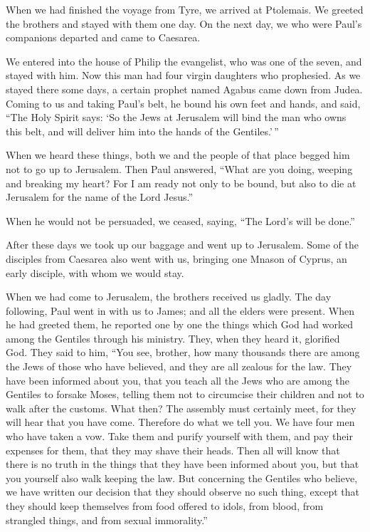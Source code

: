 When we had finished the voyage from Tyre, we arrived at
Ptolemais. We greeted the brothers and stayed with them one day.
 On the next day, we who were Paul's companions departed
and came to Caesarea.

We entered into the house of Philip the evangelist, who was one of the
seven, and stayed with him.  Now this man had four virgin
daughters who prophesied.  As we stayed there some days,
a certain prophet named Agabus came down from Judea. 
Coming to us and taking Paul's belt, he bound his own feet and hands,
and said, ``The Holy Spirit says: `So the Jews at Jerusalem will bind
the man who owns this belt, and will deliver him into the hands of the
Gentiles.'\,''

 When we heard these things, both we and the people of
that place begged him not to go up to Jerusalem.  Then
Paul answered, ``What are you doing, weeping and breaking my heart? For
I am ready not only to be bound, but also to die at Jerusalem for the
name of the Lord Jesus.''

 When he would not be persuaded, we ceased, saying, ``The
Lord's will be done.''

 After these days we took up our baggage and went up to
Jerusalem.  Some of the disciples from Caesarea also went
with us, bringing one Mnason of Cyprus, an early disciple, with whom we
would stay.

 When we had come to Jerusalem, the brothers received us
gladly.  The day following, Paul went in with us to
James; and all the elders were present.  When he had
greeted them, he reported one by one the things which God had worked
among the Gentiles through his ministry.  They, when they
heard it, glorified God. They said to him, ``You see, brother, how many
thousands there are among the Jews of those who have believed, and they
are all zealous for the law.  They have been informed
about you, that you teach all the Jews who are among the Gentiles to
forsake Moses, telling them not to circumcise their children and not to
walk after the customs.  What then? The assembly must
certainly meet, for they will hear that you have come. 
Therefore do what we tell you. We have four men who have taken a vow.
 Take them and purify yourself with them, and pay their
expenses for them, that they may shave their heads. Then all will know
that there is no truth in the things that they have been informed about
you, but that you yourself also walk keeping the law. 
But concerning the Gentiles who believe, we have written our decision
that they should observe no such thing, except that they should keep
themselves from food offered to idols, from blood, from strangled
things, and from sexual immorality.''

